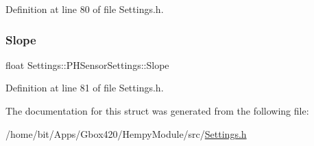 Definition at line 80 of file Settings.\+h.

\mbox{\label{struct_settings_1_1_p_h_sensor_settings_aca73249a393a8b9ee26e6f2b650386b3}} 
\subsubsection{\texorpdfstring{Slope}{Slope}}
{\footnotesize\ttfamily float Settings\+::\+P\+H\+Sensor\+Settings\+::\+Slope}



Definition at line 81 of file Settings.\+h.



The documentation for this struct was generated from the following file\+:\begin{DoxyCompactItemize}
\item 
/home/bit/\+Apps/\+Gbox420/\+Hempy\+Module/src/\hyperlink{_hempy_module_2src_2_settings_8h}{Settings.\+h}\end{DoxyCompactItemize}
